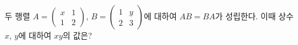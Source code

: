 두 행렬 $A=\begin{pmatrix} x & 1 \\ 1 & 2 \end{pmatrix}$, $B=\begin{pmatrix} 1 & y \\ 2 & 3 \end{pmatrix}$에 대하여 $AB=BA$가 성립한다. 이때 상수 $x$, $y$에 대하여 $xy$의 값은?
